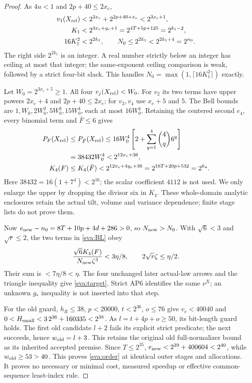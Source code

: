 \documentclass[11pt]{article}
\theoremstyle{plain}
\theoremstyle{definition}
\theoremstyle{remark}
\begin{document}
\begin{proof}
As $4u<1$ and $2p+40\le2x_e$,
\begin{align}\label{sva:K1-enclosure}
 v_1(X_{\rm rel})&<2^{3x_e}+2^{2p+40+x_e}<2^{3x_e+1},\nonumber\\
 K_1&<2^{3x_e+y_e+1}=2^{4T+5p+125}=2^{k_1-2},\nonumber\\
 16K_1^2&<2^{2k_1},\qquad
 N_0\le2^{2k_1}<2^{2k_1+4}=2^{n_0}.
\end{align}
The right side $2^{2k_1}$ is an integer. A real number strictly below
an integer has ceiling at most that integer; the same-exponent ceiling
comparison is weak, followed by a strict four-bit slack. This handles
$N_0=\max(1,\lceil16K_1^2\rceil)$ exactly.

Let $W_0=2^{3x_e+5}\ge1$. All four $v_j(X_{\rm rel})<W_0$.
For $v_2$ its two terms have upper powers $2x_e+4$ and
$2p+40\le2x_e$; for $v_3,v_4$ use $x_e+5$ and $5$.
The Bell bounds are $1,W_0,2W_0^2,5W_0^3,15W_0^4$, each at most
$16W_0^4$. Retaining the centered second $e_4$, every binomial term
and $\bar F\le6$ gives
\begin{align}\label{sva:Bell-enclosure}
 P_F(X_{\rm rel})&\le P_{\bar F}(X_{\rm rel})
 \le16W_0^4\left[2+\sum_{q=1}^4\binom4q6^q\right]\nonumber\\
 &=38432W_0^4<2^{12x_e+36},\nonumber\\
 K_4(F)&\le K_4(\bar F)<2^{12x_e+4y_e+36}
                         =2^{16T+20p+532}=2^{k_4}.
\end{align}
Here $38432=16(1+7^4)<2^{16}$; the scalar coefficient $4112$ is not
used. We only enlarge the upper by dropping the divisor six in $K_4$.
These whole-domain analytic enclosures retain the actual tilt, volume
and variance dependence; finite stage lists do not prove them.

Now $e_{\rm new}-n_0=8T+10p+4d+286>0$, so $N_{\rm new}>N_0$.
With $\sqrt6<3$ and $\sqrt r\le2$, the two terms in \eqref{sva:BL}
obey
\begin{equation}\label{sva:allocation}
 {\sqrt6K_4(F)\over N_{\rm new}\zeta^3}<3\eta/8,
 \qquad2\sqrt r\zeta\le\eta/2.
\end{equation}
Their sum is $<7\eta/8<\eta$. The four unchanged later actual-law
arrows and the triangle inequality give \eqref{sva:target}. Strict
AP6 identifies the same $\nu^X$; an unknown $g_*$ inequality is not
inserted into that step.

For the old guard, $h_R\le38$, $p<20000$, $t<2^{36}$, $o\le76$
give $v_e<40040$ and $0<H_{\rm small}<3\,2^{36}+160335<2^{38}$.
As $l=t+4p+o\ge50$, its bit-length guard holds. The first old candidate
$l+2$ fails its explicit strict predicate; the next succeeds, hence
$w_{\rm old}=l+3$. This retains the original old full-normalizer bound
as its inherited accepted premise. Since $T\le2^{35}$,
$e_{\rm new}<2^{39}+400604<2^{40}$, while
$w_{\rm old}\ge53>40$. This proves \eqref{sva:order} at identical
outer stages and allocations. It proves no necessary or minimal cost,
measured speedup or effective common-sequence least-index rule.
\end{proof}
\end{document}
